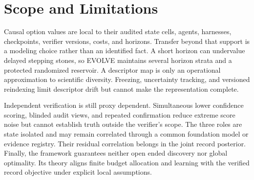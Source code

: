 \documentclass{article}
\begin{document}
\section{Scope and Limitations}
\label{seclimitations}

Causal option values are local to their audited state cells, agents, harnesses, checkpoints, verifier versions, costs, and horizons. Transfer beyond that support is a modeling choice rather than an identified fact. A short horizon can undervalue delayed stepping stones, so EVOLVE maintains several horizon strata and a protected randomized reservoir. A descriptor map is only an operational approximation to scientific diversity. Freezing, uncertainty tracking, and versioned reindexing limit descriptor drift but cannot make the representation complete.

Independent verification is still proxy dependent. Simultaneous lower confidence scoring, blinded audit views, and repeated confirmation reduce extreme score noise but cannot establish truth outside the verifier's scope. The three roles are state isolated and may remain correlated through a common foundation model or evidence registry. Their residual correlation belongs in the joint record posterior. Finally, the framework guarantees neither open ended discovery nor global optimality. Its theory aligns finite budget allocation and learning with the verified record objective under explicit local assumptions.
\end{document}

